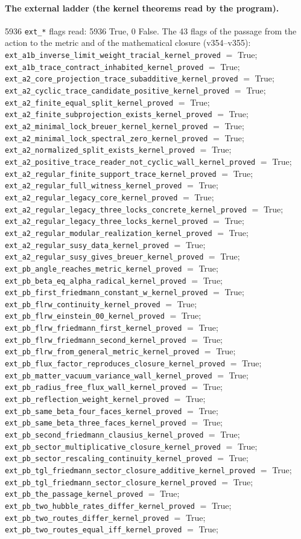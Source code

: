 \documentclass[11pt]{article}
\theoremstyle{definition}\newtheorem{deriv}{Derivation}
\begin{document}
\paragraph*{The external ladder (the kernel theorems read by the program).} 5936 \texttt{ext\_*} flags read: 5936 True, 0 False. The 43 flags of the passage from the action to the metric and of the mathematical closure (v354--v355): \texttt{ext\_a1b\_inverse\_limit\_weight\_tracial\_kernel\_proved} $=$ True; \texttt{ext\_a1b\_trace\_contract\_inhabited\_kernel\_proved} $=$ True; \texttt{ext\_a2\_core\_projection\_trace\_subadditive\_kernel\_proved} $=$ True; \texttt{ext\_a2\_cyclic\_trace\_candidate\_positive\_kernel\_proved} $=$ True; \texttt{ext\_a2\_finite\_equal\_split\_kernel\_proved} $=$ True; \texttt{ext\_a2\_finite\_subprojection\_exists\_kernel\_proved} $=$ True; \texttt{ext\_a2\_minimal\_lock\_breuer\_kernel\_kernel\_proved} $=$ True; \texttt{ext\_a2\_minimal\_lock\_spectral\_zero\_kernel\_proved} $=$ True; \texttt{ext\_a2\_normalized\_split\_exists\_kernel\_proved} $=$ True; \texttt{ext\_a2\_positive\_trace\_reader\_not\_cyclic\_wall\_kernel\_proved} $=$ True; \texttt{ext\_a2\_regular\_finite\_support\_trace\_kernel\_proved} $=$ True; \texttt{ext\_a2\_regular\_full\_witness\_kernel\_proved} $=$ True; \texttt{ext\_a2\_regular\_legacy\_core\_kernel\_proved} $=$ True; \texttt{ext\_a2\_regular\_legacy\_three\_locks\_concrete\_kernel\_proved} $=$ True; \texttt{ext\_a2\_regular\_legacy\_three\_locks\_kernel\_proved} $=$ True; \texttt{ext\_a2\_regular\_modular\_realization\_kernel\_proved} $=$ True; \texttt{ext\_a2\_regular\_susy\_data\_kernel\_proved} $=$ True; \texttt{ext\_a2\_regular\_susy\_gives\_breuer\_kernel\_proved} $=$ True; \texttt{ext\_pb\_angle\_reaches\_metric\_kernel\_proved} $=$ True; \texttt{ext\_pb\_beta\_eq\_alpha\_radical\_kernel\_proved} $=$ True; \texttt{ext\_pb\_first\_friedmann\_constant\_w\_kernel\_proved} $=$ True; \texttt{ext\_pb\_flrw\_continuity\_kernel\_proved} $=$ True; \texttt{ext\_pb\_flrw\_einstein\_00\_kernel\_proved} $=$ True; \texttt{ext\_pb\_flrw\_friedmann\_first\_kernel\_proved} $=$ True; \texttt{ext\_pb\_flrw\_friedmann\_second\_kernel\_proved} $=$ True; \texttt{ext\_pb\_flrw\_from\_general\_metric\_kernel\_proved} $=$ True; \texttt{ext\_pb\_flux\_factor\_reproduces\_closure\_kernel\_proved} $=$ True; \texttt{ext\_pb\_matter\_vacuum\_variance\_wall\_kernel\_proved} $=$ True; \texttt{ext\_pb\_radius\_free\_flux\_wall\_kernel\_proved} $=$ True; \texttt{ext\_pb\_reflection\_weight\_kernel\_proved} $=$ True; \texttt{ext\_pb\_same\_beta\_four\_faces\_kernel\_proved} $=$ True; \texttt{ext\_pb\_same\_beta\_three\_faces\_kernel\_proved} $=$ True; \texttt{ext\_pb\_second\_friedmann\_clausius\_kernel\_proved} $=$ True; \texttt{ext\_pb\_sector\_multiplicative\_closure\_kernel\_proved} $=$ True; \texttt{ext\_pb\_sector\_rescaling\_continuity\_kernel\_proved} $=$ True; \texttt{ext\_pb\_tgl\_friedmann\_sector\_closure\_additive\_kernel\_proved} $=$ True; \texttt{ext\_pb\_tgl\_friedmann\_sector\_closure\_kernel\_proved} $=$ True; \texttt{ext\_pb\_the\_passage\_kernel\_proved} $=$ True; \texttt{ext\_pb\_two\_hubble\_rates\_differ\_kernel\_proved} $=$ True; \texttt{ext\_pb\_two\_routes\_differ\_kernel\_proved} $=$ True; \texttt{ext\_pb\_two\_routes\_equal\_iff\_kernel\_proved} $=$ True; 
\end{document}
